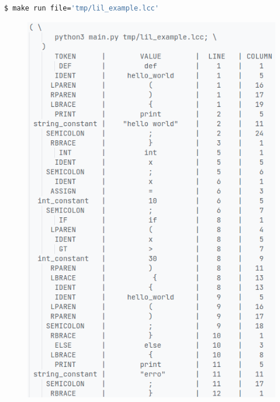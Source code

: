 \documentclass{exam}
\begin{document}
\begin{questions}
\begin{solution}
        \end{solution}
       
            \begin{center}
            \begin{lstlisting}[language=bash]
             $ make run file='tmp/lil_example.lcc'
            \end{lstlisting}
            \includegraphics[height=17cm,width=16cm,keepaspectratio]{example.png}
            \end{center}
\end{questions}
\end{document}
